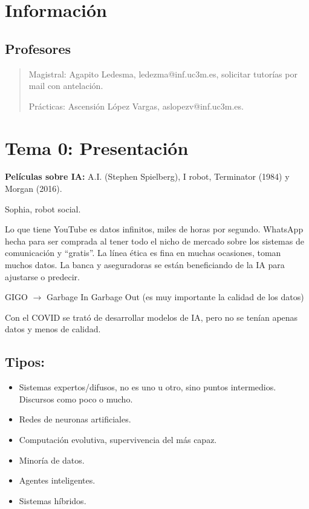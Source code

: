 \documentclass[12pt, twoside, openright]{report} %
\begin{document}
\listoffigures
\thispagestyle{fancy}

\listoftables
\thispagestyle{fancy}





\chapter{Información}

\section{Profesores}
\begin{quote}
	Magistral: Agapito Ledesma, ledezma@inf.uc3m.es, solicitar tutorías por mail con antelación.
	
	Prácticas: Ascensión López Vargas, aslopezv@inf.uc3m.es.
\end{quote}

\chapter{Tema 0: Presentación}

\textbf{Películas sobre IA:} A.I. (Stephen Spielberg), I robot, Terminator (1984) y Morgan (2016).

Sophia, robot social.

Lo que tiene YouTube es datos infinitos, miles de horas por segundo.
WhatsApp hecha para ser comprada al tener todo el nicho de mercado sobre los sistemas de comunicación y “gratis”.
La línea ética es fina en muchas ocasiones, toman muchos datos. La banca y aseguradoras se están beneficiando de la IA para ajustarse o predecir.

GIGO $\rightarrow$ Garbage In Garbage Out (es muy importante la calidad de los datos)

Con el COVID se trató de desarrollar modelos de IA, pero no se tenían apenas datos y menos de calidad.

\section{Tipos:}
\begin{itemize}
	\item Sistemas expertos/difusos, no es uno u otro, sino puntos intermedios. Discursos como poco o mucho.
	\item Redes de neuronas artificiales.
	\item Computación evolutiva, supervivencia del más capaz.
	\item Minoría de datos.
	\item Agentes inteligentes.
	\item Sistemas híbridos.
\end{itemize}
\end{document}
